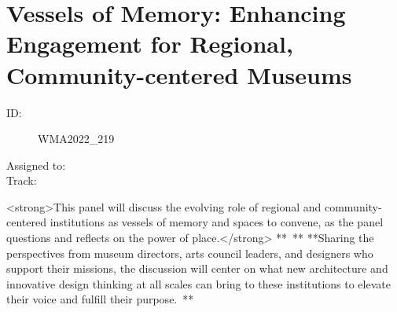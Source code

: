 \documentclass{report}
\begin{document}
              

              

              
        
          \newpage
          \section{ Vessels of Memory: Enhancing Engagement for Regional, Community-centered Museums     }
            \begin{description}
              \item [ID:]
              WMA2022\_219

              \item [Assigned to:]
                \item [Track:]
              \end{description}

              <strong>This panel will discuss the evolving role of regional and community-centered institutions as vessels of memory and spaces to convene, as the panel questions and reflects on the power of place.</strong>
** **
**Sharing the perspectives from museum directors, arts council leaders, and designers who support their missions, the discussion will center on what new architecture and innovative design thinking at all scales can bring to these institutions to elevate their voice and fulfill their purpose. **
\end{document}
